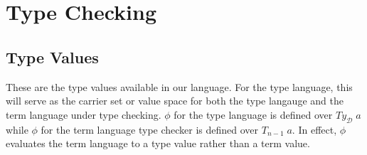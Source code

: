 \documentclass[10pt]{article}
\newcommand{\Varid}[1]{\mathit{#1}}
\begin{document}
\section{Type Checking}

\subsection{Type Values}

These are the type values available in our language.  For the type
language, this will serve as the carrier set or value space for both
the type langauge and the term language under type checking.  \ensuremath{\Varid{\phi}}
for the type language is defined over \ensuremath{\Varid{Ty}_{\mathcal D}\;\Varid{a}} while \ensuremath{\Varid{\phi}} for the term
language type checker is defined over \ensuremath{\Varid{T}_{n-1}\;\Varid{a}}.  In effect, \ensuremath{\Varid{\phi}}
evaluates the term language to a type value rather than a term value.
\end{document}

